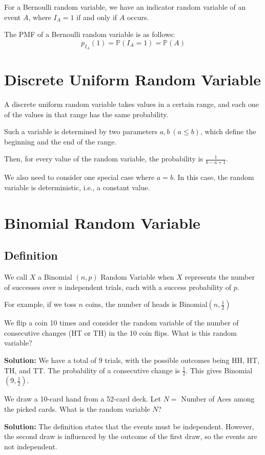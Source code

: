 For a Bernoulli random variable, we have an indicator random variable of an event \(A\), where \(I_A = 1\) if and only if \(A\) occurs.  

The PMF of a Bernoulli random variable is as follows:  
\[
  p_{I_A}(1) = \mathbb{P} (I_A = 1) = \mathbb{P} (A)
\]

\section{Discrete Uniform Random Variable}
A discrete uniform random variable takes values in a certain range, and each one of the values in that range has the same probability.  

Such a variable is determined by two parameters \(a, b\ (a \leq b)\), which define the beginning and the end of the range.  

Then, for every value of the random variable, the probability is \(\frac{1}{b - a + 1}\).  

We also need to consider one special case where \(a = b\). In this case, the random variable is deterministic, i.e., a constant value.

\section{Binomial Random Variable}
\subsection{Definition}
We call \(X\) a Binomial \((n, p)\) Random Variable when \(X\) represents the number of successes over \(n\) independent trials, each with a success probability of \(p\).

For example, if we toss \(n\) coins, the number of heads is Binomial\((n,\frac{1}{2})\) 

\begin{eg}
We flip a coin 10 times and consider the random variable of the number of consecutive changes (HT or TH) in the 10 coin flips. What is this random variable?

\textbf{Solution:} 
We have a total of 9 trials, with the possible outcomes being HH, HT, TH, and TT. The probability of a consecutive change is \(\frac{1}{2}\). This gives Binomial\((9, \frac{1}{2})\). 
\end{eg}

\begin{eg}
  We draw a 10-card hand from a 52-card deck. Let \(N =\) Number of Aces among the picked cards. What is the random variable \(N\)?
  
  \textbf{Solution:} 
  The definition states that the events must be independent. However, the second draw is influenced by the outcome of the first draw, so the events are not independent.
\end{eg}

